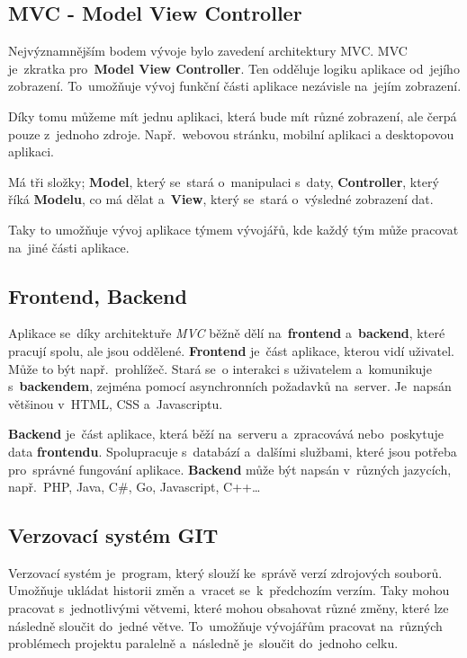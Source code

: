 \documentclass[14pt,a4paper]{article}
\begin{document}
        
        \subsection{MVC - Model View Controller}
        Nejvýznamnějším bodem vývoje bylo zavedení architektury MVC. MVC je~zkratka pro~\textbf{Model View Controller}.
        Ten odděluje logiku aplikace od~jejího zobrazení. To~umožňuje vývoj funkční části aplikace nezávisle na~jejím zobrazení.

        Díky tomu můžeme mít jednu aplikaci, která bude mít různé zobrazení, ale čerpá pouze z~jednoho zdroje. Např.~webovou stránku, mobilní aplikaci a desktopovou aplikaci.

        Má tři složky; \textbf{Model}, který se~stará o~manipulaci s~daty, \textbf{Controller}, který říká \textbf{Modelu}, co má dělat
        a~\textbf{View}, který se~stará o~výsledné zobrazení dat.

        Taky to umožňuje vývoj aplikace týmem vývojářů, kde každý tým může pracovat na~jiné části aplikace.

        \subsection{Frontend, Backend}
        Aplikace se~díky architektuře \emph{MVC} běžně dělí na~\textbf{frontend} a~\textbf{backend}, které pracují spolu, ale jsou oddělené.
        \textbf{Frontend} je~část aplikace, kterou vidí uživatel. Může to být např.~prohlížeč. Stará se~o interakci s uživatelem a~komunikuje s~\textbf{backendem},
        zejména pomocí asynchronních požadavků na~server. Je~napsán většinou v~HTML, CSS a~Javascriptu.

        \textbf{Backend} je~část aplikace, která běží na~serveru a~zpracovává nebo~poskytuje data \textbf{frontendu}.
        Spolupracuje s~databází a~dalšími službami, které jsou potřeba pro~správné fungování aplikace.
        \textbf{Backend} může být napsán v~různých jazycích, např.~PHP, Java, C\#, Go, Javascript, C++\dots


        \subsection{Verzovací systém GIT}
        Verzovací systém je~program, který slouží ke~správě verzí zdrojových souborů.
        Umožňuje ukládat historii změn a~vracet se~k~předchozím verzím. Taky mohou pracovat s~jednotlivými větvemi,
        které mohou obsahovat různé změny, které lze následně sloučit do~jedné větve.
        To~umožňuje vývojářům pracovat na~různých problémech projektu paralelně a~následně je~sloučit do~jednoho celku.
\end{document}
